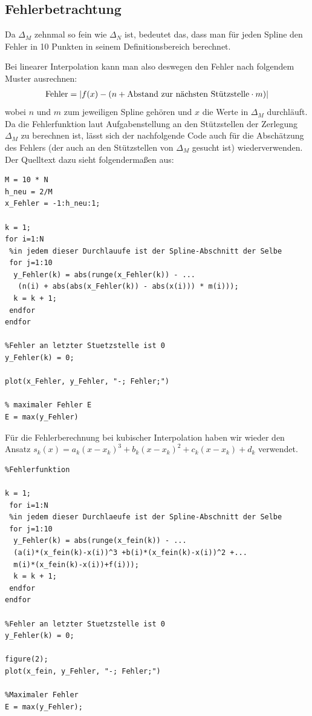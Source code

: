 \documentclass[ngerman,a4paper]{texmf/tex/latex/mathscript/mathscript}
\begin{document}
	
	\subsection{Fehlerbetrachtung}
	
	Da $\Delta_M$ zehnmal so fein wie $\Delta_N$ ist, bedeutet das, dass man für jeden Spline den Fehler in 10 Punkten in seinem Definitionsbereich berechnet.
	
	Bei linearer Interpolation kann man also deswegen den Fehler nach folgendem Muster ausrechnen:
	\begin{align}
		\text{Fehler} = \vert f(x) - (n + \text{Abstand zur nächsten Stützstelle}\cdot m) \vert \notag
	\end{align}
	wobei $n$ und $m$ zum jeweiligen Spline gehören und $x$ die Werte in $\Delta_M$ durchläuft. Da die Fehlerfunktion laut Aufgabenstellung an den Stützstellen der Zerlegung $\Delta_M$ zu berechnen ist, lässt sich der nachfolgende Code auch für die Abschätzung des Fehlers (der auch an den Stützstellen von $\Delta_M$ gesucht ist) wiederverwenden. Der Quelltext dazu sieht folgendermaßen aus:
\begin{lstlisting}
M = 10 * N
h_neu = 2/M
x_Fehler = -1:h_neu:1;

k = 1;
for i=1:N
 %in jedem dieser Durchlauufe ist der Spline-Abschnitt der Selbe
 for j=1:10
  y_Fehler(k) = abs(runge(x_Fehler(k)) - ...
   (n(i) + abs(abs(x_Fehler(k)) - abs(x(i))) * m(i)));
  k = k + 1;
 endfor
endfor

%Fehler an letzter Stuetzstelle ist 0
y_Fehler(k) = 0;

plot(x_Fehler, y_Fehler, "-; Fehler;")

% maximaler Fehler E
E = max(y_Fehler)
\end{lstlisting}

Für die Fehlerberechnung bei kubischer Interpolation haben wir wieder den Ansatz $s_k(x) = a_k(x-x_k)^3 + b_k(x-x_k)^2 + c_k(x-x_k) + d_k$ verwendet.
\begin{lstlisting}
%Fehlerfunktion

k = 1;
 for i=1:N
 %in jedem dieser Durchlaeufe ist der Spline-Abschnitt der Selbe
 for j=1:10
  y_Fehler(k) = abs(runge(x_fein(k)) - ...
  (a(i)*(x_fein(k)-x(i))^3 +b(i)*(x_fein(k)-x(i))^2 +...
  m(i)*(x_fein(k)-x(i))+f(i)));
  k = k + 1;
 endfor
endfor

%Fehler an letzter Stuetzstelle ist 0
y_Fehler(k) = 0;

figure(2);
plot(x_fein, y_Fehler, "-; Fehler;")

%Maximaler Fehler
E = max(y_Fehler);
\end{lstlisting}
	
\end{document}
